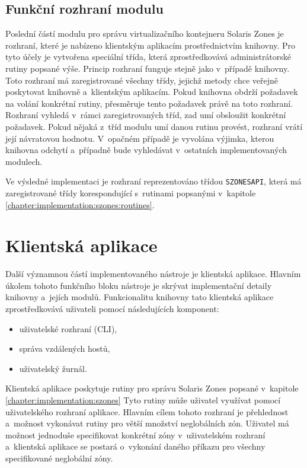 \subsection{Funkční rozhraní modulu}
\label{chapter:implementation:szones:api}
Poslední částí modulu pro správu virtualizačního kontejneru Solaris Zones je rozhraní, které je nabízeno klientským aplikacím
prostřednictvím knihovny. Pro tyto účely je vytvořena speciální třída, která zprostředkovává administrátorské rutiny popsané 
výše. Princip rozhraní funguje stejně jako v~případě knihovny. Toto rozhraní má zaregistrované všechny 
třídy, jejichž metody chce veřejně poskytovat knihovně a~klientským aplikacím. Pokud knihovna obdrží požadavek na volání konkrétní
rutiny, přesměruje tento požadavek právě na toto rozhraní. Rozhraní vyhledá v~rámci zaregistrovaných tříd, zad umí obsloužit
konkrétní požadavek. Pokud nějaká z~tříd modulu umí danou rutinu provést, rozhraní vrátí její návratovou hodnotu. V~opačném případě
je vyvolána výjimka, kterou knihovna odchytí a~případně bude vyhledávat v~ostatních implementovaných modulech.

Ve výsledné implementaci je rozhraní reprezentováno třídou \verb|SZONESAPI|, která má zaregistrované třídy korespondující
s~rutinami popsanými v~kapitole \ref{chapter:implementation:szones:routines}.
\section{Klientská aplikace}
\label{chapter:implementation:client}
Další významnou částí implementovaného nástroje je klientská aplikace. Hlavním úkolem tohoto funkčního bloku nástroje je 
skrývat implementační detaily knihovny a~jejích modulů. Funkcionalitu knihovny tato klientská aplikace zprostředkovává
uživateli pomocí následujících komponent:
\begin{itemize}
 \item uživatelské rozhraní (CLI),
 \item správa vzdálených hostů,
 \item uživatelský žurnál.
\end{itemize}
Klientská aplikace poskytuje rutiny pro správu Solaris Zones popsané v~kapitole \ref{chapter:implementation:szones}
Tyto rutiny může uživatel využívat pomocí uživatelského rozhraní aplikace. Hlavním cílem tohoto
rozhraní je přehlednost a~možnost vykonávat rutiny pro větší množství neglobálních zón. Uživatel má možnost jednoduše
specifikovat konkrétní zóny v~uživatelském rozhraní a~klientská aplikace se postará o~vykonání daného příkazu pro všechny
specifikované neglobální zóny.

